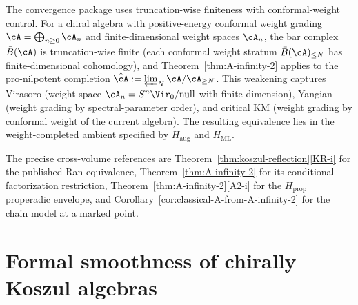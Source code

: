 \begin{remark}
\label{rem:ainf2-heal-74}

The convergence package uses truncation-wise finiteness with
conformal-weight control.  For a chiral algebra with positive-energy conformal
weight grading
$\cA = \bigoplus_{n\geq 0} \cA_n$ and finite-dimensional
weight spaces $\cA_n$, the bar complex $\bar B(\cA)$ is
truncation-wise finite (each conformal weight stratum
$\bar B(\cA)_{\leq N}$ has finite-dimensional cohomology), and
Theorem~\ref{thm:A-infinity-2} applies to the pro-nilpotent completion
$\hat\cA := \varprojlim_N \cA / \cA_{\geq N}$. This weakening captures
Virasoro (weight space $\cA_n = S^n \Vir_0 / \mathrm{null}$ with
finite dimension), Yangian (weight grading by spectral-parameter
order), and critical KM (weight grading by conformal weight of
the current algebra).  The resulting equivalence lies in the
weight-completed ambient specified by $H_{\mathrm{aug}}$ and
$H_{\mathrm{ML}}$.
\end{remark}

\begin{remark}
\label{rem:ainf2-heal-195}

The precise cross-volume references are
Theorem~\ref{thm:koszul-reflection}\ref{KR-i} for the published Ran
equivalence, Theorem~\ref{thm:A-infinity-2} for its conditional
factorization restriction, Theorem~\ref{thm:A-infinity-2}\ref{A2-i}
for the $H_{\mathrm{prop}}$ properadic envelope, and
Corollary~\ref{cor:classical-A-from-A-infinity-2} for the chain model
at a marked point.
\end{remark}

\section{Formal smoothness of chirally Koszul algebras}\label{sec:ainf2-formal-smoothness}

